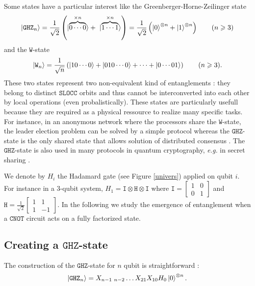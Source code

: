 \documentclass[a4paper,12pt,fleqn]{article}
\newcommand\SLOCC{\mathtt{SLOCC}}
\newcommand\W{\mathtt{W}}
\newcommand\GHZ{\mathtt{GHZ}}
\newcommand\cnot{\mathtt{CNOT}}
\renewcommand\geq{\geqslant}
\begin{document}
    Some states have a particular interest like the Greenberger-Horne-Zeilinger state \cite{1990GHZ}
\begin{equation}
  \ket{\GHZ_{n}}=\frac1{\sqrt2}\left(\ket{\overbrace{0\cdots0}^{\times n}}+\ \ket{\overbrace{1\cdots1}^{\times n}}\right)=
  \frac1{\sqrt2}\left(\ket{0}^{\otimes n}+\ket{1}^{\otimes n}\right)\qquad(n\geq  3)
\end{equation}
and the $\W$-state \cite{2000DVC}
\begin{equation}
	\ket{\W_{n}}=\frac1{\sqrt n}\left(\ket{10\cdots0}+\ket{010\cdots0}+\cdots+\ket{0\cdots01}\right) \qquad(n\geq  3). 
\end{equation}
These two states represent two non-equivalent kind of entanglements : they belong to distinct $\SLOCC$ orbits and thus cannot be interconverted into each other by local operations
(even probalistically).
These states are particularly usefull because they are required as a physical ressource to realize many specific tasks.
For instance, in  an anonymous network where the processors
share the $\W$-state, the leader election problem can be solved by a simple protocol 
whereas the $\GHZ$-state is the only shared state
that allows solution of distributed consensus \cite{2004DP}.
The $\GHZ$-state is also used in many protocols in quantum cryptography, \emph{e.g.} in secret sharing \cite{1999Hillery}.
\medskip


We denote by $H_i$ the Hadamard gate (see Figure \ref{univers}) applied on qubit $i$. For instance in a 3-qubit system, $H_1=\mathtt{I}\otimes \mathtt{H}\otimes\mathtt{I}$ where $\mathtt{I}=\begin{bmatrix}1&0\\0&1\end{bmatrix}$ and $\mathtt{H}=\frac{1}{\sqrt{2}}\begin{bmatrix}1&1\\1&-1\end{bmatrix}$.
In the following we study the emergence of entanglement when a $\cnot$ circuit acts on a fully factorized state.

\subsection{Creating a $\GHZ$-state}
The construction of the $\GHZ$-state for $n$ qubit is straightforward :
\begin{equation}
\ket{\GHZ_n}=X_{n-1\ n-2}\dots X_{21}X_{10}H_0\ket{0}^{\otimes n}.\label{GHZ}
\end{equation}
\end{document}
